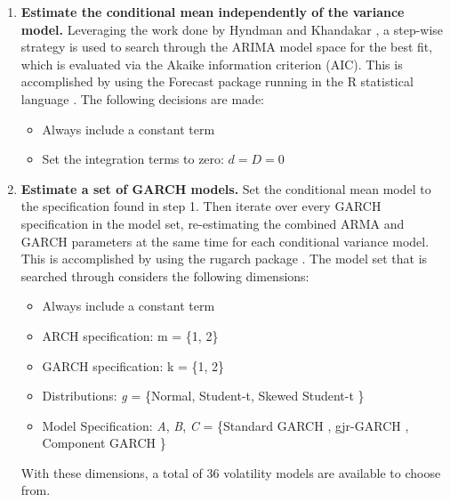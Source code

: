 \documentclass[12pt]{report}
\begin{document}
\begin{enumerate}
    \item \textbf{Estimate the conditional mean independently of the variance model.} Leveraging the work done by Hyndman and Khandakar \cite{HyndmanKhandakar2008AutoArima}, a step-wise strategy is used to search through the ARIMA model space for the best fit, which is evaluated via the Akaike information criterion (AIC). This is accomplished by using the Forecast package \cite{RForecast} running in the R statistical language \cite{RBase}. The following decisions are made: 
    
    \begin{itemize}
        \item Always include a constant term
        \item Set the integration terms to zero: $d = D = 0$
    \end{itemize}
    
    \item \textbf{Estimate a set of GARCH models.} Set the conditional mean model to the specification found in step 1. Then iterate over every GARCH specification in the model set, re-estimating the combined ARMA and GARCH parameters at the same time for each conditional variance model. This is accomplished by using the rugarch package \cite{Rugarch}. The model set that is searched through considers the following dimensions:
    
    \begin{itemize}
        \item Always include a constant term
        \item ARCH specification: m = \{1, 2\}
        \item GARCH specification: k = \{1, 2\}
        \item Distributions: \emph{g} = \{Normal, Student-t, Skewed Student-t \cite{FernandezSteel1998}\}
        \item Model Specification: \emph{A}, \emph{B}, \emph{C} = \{Standard GARCH \cite{Bollerslev1986Garch}, gjr-GARCH \cite{GJR1993Garch}, Component GARCH \cite{EngleLee1993APA} \}
    \end{itemize}
    
    With these dimensions, a total of 36 volatility models are available to choose from.


\end{enumerate}
\end{document}
